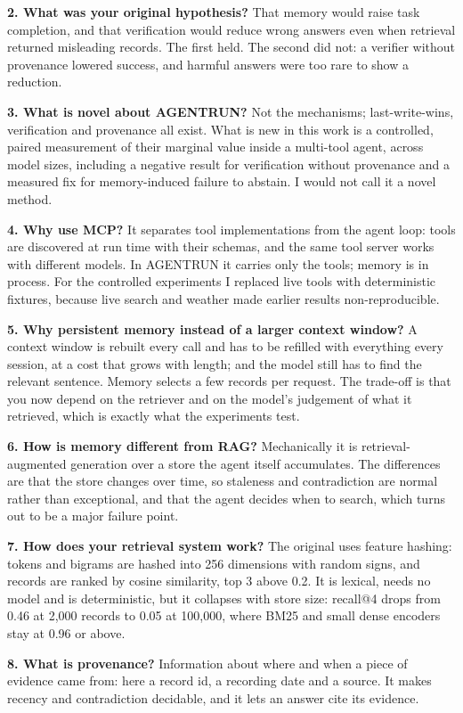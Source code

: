 \documentclass[10.5pt,a4paper,oneside]{report}
\begin{document}
\textbf{2. What was your original hypothesis?} That memory would raise task completion, and that verification would reduce wrong answers even when retrieval returned misleading records. The first held. The second did not: a verifier without provenance lowered success, and harmful answers were too rare to show a reduction.

\textbf{3. What is novel about AGENTRUN?} Not the mechanisms; last-write-wins, verification and provenance all exist. What is new in this work is a controlled, paired measurement of their marginal value inside a multi-tool agent, across model sizes, including a negative result for verification without provenance and a measured fix for memory-induced failure to abstain. I would not call it a novel method.

\textbf{4. Why use MCP?} It separates tool implementations from the agent loop: tools are discovered at run time with their schemas, and the same tool server works with different models. In AGENTRUN it carries only the tools; memory is in process. For the controlled experiments I replaced live tools with deterministic fixtures, because live search and weather made earlier results non-reproducible.

\textbf{5. Why persistent memory instead of a larger context window?} A context window is rebuilt every call and has to be refilled with everything every session, at a cost that grows with length; and the model still has to find the relevant sentence. Memory selects a few records per request. The trade-off is that you now depend on the retriever and on the model's judgement of what it retrieved, which is exactly what the experiments test.

\textbf{6. How is memory different from RAG?} Mechanically it is retrieval-augmented generation over a store the agent itself accumulates. The differences are that the store changes over time, so staleness and contradiction are normal rather than exceptional, and that the agent decides when to search, which turns out to be a major failure point.

\textbf{7. How does your retrieval system work?} The original uses feature hashing: tokens and bigrams are hashed into 256 dimensions with random signs, and records are ranked by cosine similarity, top 3 above 0.2. It is lexical, needs no model and is deterministic, but it collapses with store size: recall@4 drops from 0.46 at 2,000 records to 0.05 at 100,000, where BM25 and small dense encoders stay at 0.96 or above.

\textbf{8. What is provenance?} Information about where and when a piece of evidence came from: here a record id, a recording date and a source. It makes recency and contradiction decidable, and it lets an answer cite its evidence.
\end{document}
